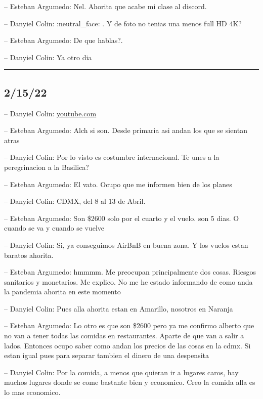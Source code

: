 -- Esteban Argumedo: Nel. Ahorita que acabe mi clase al discord.

-- Danyiel Colin: :neutral\_face: . Y de foto no tenias una menos full
HD 4K?

-- Esteban Argumedo: De que hablas?.

-- Danyiel Colin: Ya otro dia

\begin{center}\rule{0.5\linewidth}{0.5pt}\end{center}

\hypertarget{section-7}{%
\subsection{2/15/22}\label{section-7}}

-- Danyiel Colin:
\href{https://youtube.com/shorts/WcvotsNi0VU?feature=share}{youtube.com}

-- Esteban Argumedo: Alch si son. Desde primaria asi andan los que se
sientan atras

-- Danyiel Colin: Por lo visto es costumbre internacional. Te unes a la
peregrinacion a la Basilica?

-- Esteban Argumedo: El vato. Ocupo que me informen bien de los planes

-- Danyiel Colin: CDMX, del 8 al 13 de Abril.

-- Esteban Argumedo: Son \$2600 solo por el cuarto y el vuelo. son 5
dias. O cuando se va y cuando se vuelve

-- Danyiel Colin: Si, ya conseguimos AirBnB en buena zona. Y los vuelos
estan baratos ahorita.

-- Esteban Argumedo: hmmmm. Me preocupan principalmente dos cosas.
Riesgos sanitarios y monetarios. Me explico. No me he estado informando
de como anda la pandemia ahorita en este momento

-- Danyiel Colin: Pues alla ahorita estan en Amarillo, nosotros en
Naranja

-- Esteban Argumedo: Lo otro es que son \$2600 pero ya me confirmo
alberto que no van a tener todas las comidas en restaurantes. Aparte de
que van a salir a lados. Entonces ocupo saber como andan los precios de
las cosas en la cdmx. Si estan igual pues para separar tambien el dinero
de una despensita

-- Danyiel Colin: Por la comida, a menos que quieran ir a lugares caros,
hay muchos lugares donde se come bastante bien y economico. Creo la
comida alla es lo mas economico.

